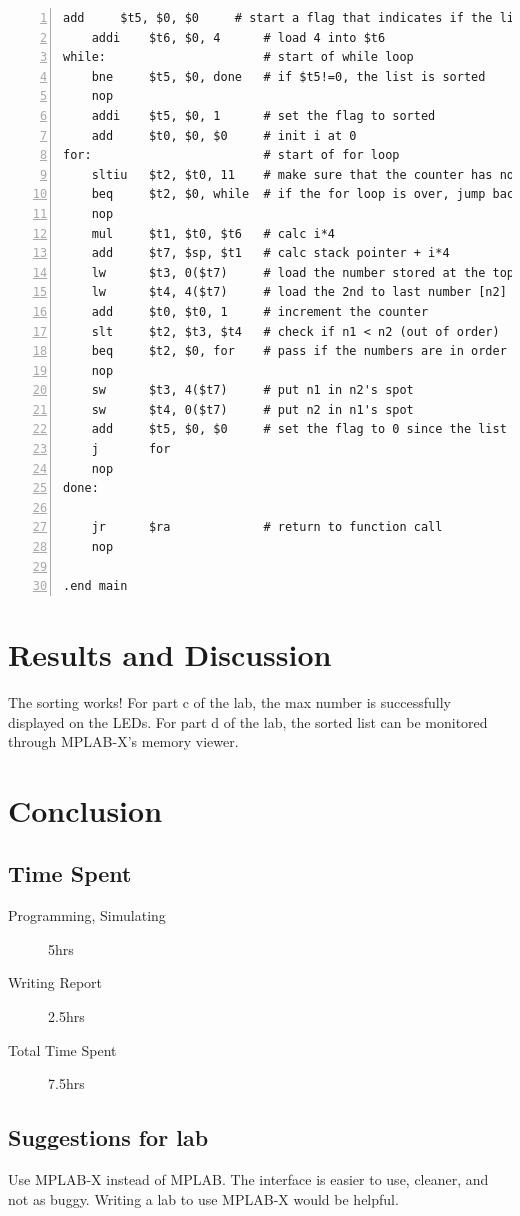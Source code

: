 \documentclass[11pt]{article}
\begin{document}
\begin{lstlisting}[numbers=left,basicstyle=\footnotesize]
    add     $t5, $0, $0     # start a flag that indicates if the list is sorted.
    addi    $t6, $0, 4      # load 4 into $t6
while:                      # start of while loop
    bne     $t5, $0, done   # if $t5!=0, the list is sorted
    nop
    addi    $t5, $0, 1      # set the flag to sorted
    add     $t0, $0, $0     # init i at 0 
for:                        # start of for loop
    sltiu   $t2, $t0, 11    # make sure that the counter has not exceeded the length of the list
    beq     $t2, $0, while  # if the for loop is over, jump back to the while loop
    nop
    mul     $t1, $t0, $t6   # calc i*4
    add     $t7, $sp, $t1   # calc stack pointer + i*4
    lw      $t3, 0($t7)     # load the number stored at the top of the stack (lowest addr) [n1]
    lw      $t4, 4($t7)     # load the 2nd to last number [n2]
    add     $t0, $t0, 1     # increment the counter
    slt     $t2, $t3, $t4   # check if n1 < n2 (out of order)
    beq     $t2, $0, for    # pass if the numbers are in order ($t2=0)
    nop
    sw      $t3, 4($t7)     # put n1 in n2's spot
    sw      $t4, 0($t7)     # put n2 in n1's spot
    add     $t5, $0, $0     # set the flag to 0 since the list is not sorted
    j       for
    nop
done:
    
    jr      $ra             # return to function call
    nop

.end main
\end{lstlisting}


\section{Results and Discussion}

The sorting works! For part c of the lab, the max number is successfully displayed on the LEDs. For part d of the lab, the sorted list can be monitored through MPLAB-X's memory viewer.


\section{Conclusion}

\subsection{Time Spent}

\begin{description}
	\item[Programming, Simulating] 5hrs
	\item[Writing Report] 2.5hrs
	\item[Total Time Spent] 7.5hrs
\end{description}

\subsection{Suggestions for lab}

Use MPLAB-X instead of MPLAB. The interface is easier to use, cleaner, and not as buggy. Writing a lab to use MPLAB-X would be helpful.
\end{document}
